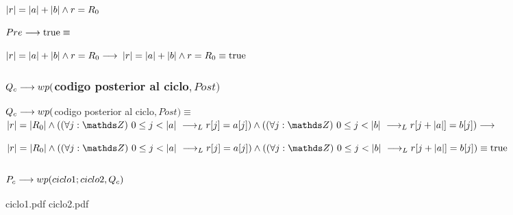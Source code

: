 \documentclass{article}
\begin{document}
$ |r| = |a| + |b| \wedge r = R_{0} $

$ Pre \longrightarrow \mathrm{true} \equiv $

$ |r| = |a| + |b| \wedge r = R_{0} \longrightarrow $
$ |r| = |a| + |b| \wedge r = R_{0} \equiv \mathrm{true}$

\subsubsection*{$Q_{c} \longrightarrow wp($codigo posterior al ciclo$, Post)$}

$Q_{c} \longrightarrow wp($codigo posterior al ciclo$, Post) \equiv$ \\

$\longitud{r} = \longitud{R_{0}} \wedge (\paraTodo{j}{0}{\longitud{a}} \implicaLuego r[j] = a[j]) \wedge (\paraTodo{j}{0}{\longitud{b}} \implicaLuego r[j+\longitud{a}] = b[j]) \implica$

$\longitud{r} = \longitud{R_{0}} \wedge (\paraTodo{j}{0}{\longitud{a}} \implicaLuego r[j] = a[j]) \wedge (\paraTodo{j}{0}{\longitud{b}} \implicaLuego r[j+\longitud{a}] = b[j]) \equiv \True$

\subsubsection*{$P_{c} \longrightarrow wp(ciclo1;ciclo2, Q_{c})$}

ciclo1.pdf
ciclo2.pdf
\end{document}
